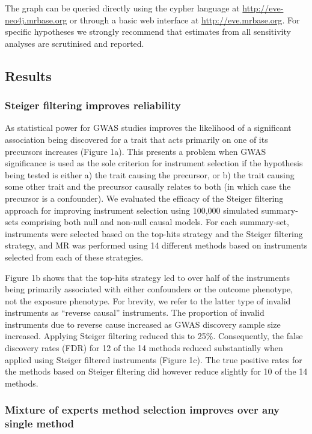 \documentclass[]{article}
\begin{document}
The graph can be queried directly using the cypher language at
\url{http://eve-neo4j.mrbase.org} or through a basic web interface at
\url{http://eve.mrbase.org}. For specific hypotheses we strongly
recommend that estimates from all sensitivity analyses are scrutinised
and reported.

\subsection{Results}\label{results}

\subsubsection{Steiger filtering improves
reliability}\label{steiger-filtering-improves-reliability}

As statistical power for GWAS studies improves the likelihood of a
significant association being discovered for a trait that acts primarily
on one of its precursors increases (Figure 1a). This presents a problem
when GWAS significance is used as the sole criterion for instrument
selection if the hypothesis being tested is either a) the trait causing
the precursor, or b) the trait causing some other trait and the
precursor causally relates to both (in which case the precursor is a
confounder). We evaluated the efficacy of the Steiger filtering approach
for improving instrument selection using 100,000 simulated summary-sets
comprising both null and non-null causal models. For each summary-set,
instruments were selected based on the top-hits strategy and the Steiger
filtering strategy, and MR was performed using 14 different methods
based on instruments selected from each of these strategies.

Figure 1b shows that the top-hits strategy led to over half of the
instruments being primarily associated with either confounders or the
outcome phenotype, not the exposure phenotype. For brevity, we refer to
the latter type of invalid instruments as ``reverse causal''
instruments. The proportion of invalid instruments due to reverse cause
increased as GWAS discovery sample size increased. Applying Steiger
filtering reduced this to 25\%. Consequently, the false discovery rates
(FDR) for 12 of the 14 methods reduced substantially when applied using
Steiger filtered instruments (Figure 1c). The true positive rates for
the methods based on Steiger filtering did however reduce slightly for
10 of the 14 methods.

\subsubsection{Mixture of experts method selection improves over any
single
method}\label{mixture-of-experts-method-selection-improves-over-any-single-method}
\end{document}
